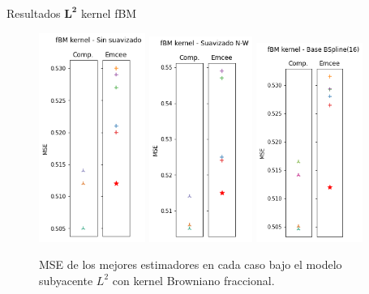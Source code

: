 \documentclass[10pt, professionalfonts]{beamer}
\begin{document}

\begin{frame}{Resultados $\boldsymbol{L^2}$ kernel fBM}
  \begin{figure}
    \includegraphics[width=0.31\textwidth]{img/results-new/reg_l2_fbm_none}\hfill
    \includegraphics[width=0.3\textwidth]{img/results-new/reg_l2_fbm_nw}\hfill
    \includegraphics[width=0.31\textwidth]{img/results-new/reg_l2_fbm_basis}
    \caption{MSE de los mejores estimadores en cada caso bajo el modelo subyacente $L^2$ con kernel Browniano fraccional.}
  \end{figure}
\end{frame}
\end{document}
